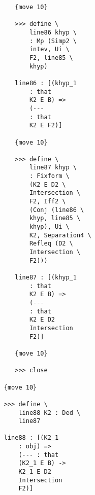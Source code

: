 \documentclass[12pt]{article}
\begin{document}
\begin{verbatim}
                                 {move 10}

                                 >>> define \
                                     line86 khyp \
                                     : Mp (Simp2 \
                                     intev, Ui \
                                     F2, line85 \
                                     khyp)

                                 line86 : [(khyp_1 
                                     : that 
                                     K2 E B) => 
                                     (--- 
                                     : that 
                                     K2 E F2)]

                                 {move 10}

                                 >>> define \
                                     line87 khyp \
                                     : Fixform \
                                     (K2 E D2 \
                                     Intersection \
                                     F2, Iff2 \
                                     (Conj (line86 \
                                     khyp, line85 \
                                     khyp), Ui \
                                     K2, Separation4 \
                                     Refleq (D2 \
                                     Intersection \
                                     F2)))

                                 line87 : [(khyp_1 
                                     : that 
                                     K2 E B) => 
                                     (--- 
                                     : that 
                                     K2 E D2 
                                     Intersection 
                                     F2)]

                                 {move 10}

                                 >>> close

                              {move 10}

                              >>> define \
                                  line88 K2 : Ded \
                                  line87

                              line88 : [(K2_1 
                                  : obj) => 
                                  (--- : that 
                                  (K2_1 E B) -> 
                                  K2_1 E D2 
                                  Intersection 
                                  F2)]


\end{verbatim}
\end{document}
